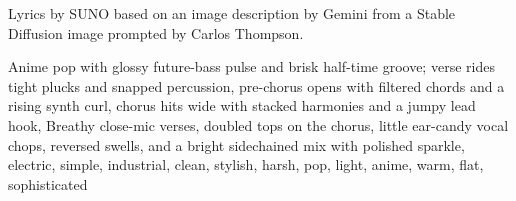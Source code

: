
\begin{notes}
Lyrics by SUNO based on an image description by Gemini from a Stable Diffusion image prompted by Carlos Thompson.
\end{notes}
\begin{style}
Anime pop with glossy future-bass pulse and brisk half-time groove; verse rides tight plucks and snapped percussion, pre-chorus opens with filtered chords and a rising synth curl, chorus hits wide with stacked harmonies and a jumpy lead hook, Breathy close-mic verses, doubled tops on the chorus, little ear-candy vocal chops, reversed swells, and a bright sidechained mix with polished sparkle, electric, simple, industrial, clean, stylish, harsh, pop, light, anime, warm, flat, sophisticated
\end{style}
